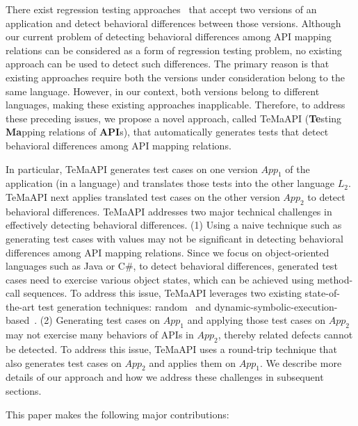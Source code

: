 There exist regression testing approaches~\cite{taneja08diffgen, robert07difference} that accept two versions of an application and detect behavioral differences between those versions. Although our current problem of detecting behavioral differences among API mapping relations can be considered as a form of regression testing problem, no existing approach can be used to detect such differences. The primary reason is that existing approaches require both the versions under consideration belong to the same language. However, in our context, both versions belong to different languages, making these existing approaches inapplicable. Therefore, to address these preceding issues, we propose a novel approach, called TeMaAPI (\textbf{Te}sting \textbf{Ma}pping relations of \textbf{API}s), that automatically generates tests that detect behavioral differences among API mapping relations.

In particular, TeMaAPI generates test cases on one version $App_1$ of the application (in a language) and translates those tests into the other language $L_2$. TeMaAPI next applies translated test cases on the other version $App_2$ to detect behavioral differences. TeMaAPI addresses two major technical challenges in effectively detecting behavioral differences. (1) Using a naive technique such as generating test cases with  values may not be significant in detecting behavioral differences among API mapping relations. Since we focus on object-oriented languages such as Java or C\#, to detect behavioral differences, generated test cases need to exercise various object states, which can be achieved using method-call sequences. To address this issue, TeMaAPI leverages two existing state-of-the-art test generation techniques: random~\cite{pacheco2007feedback} and dynamic-symbolic-execution-based~\cite{koushik:cute, godefroid:dart, tillmann2008pex}. (2) Generating test cases on $App_1$ and applying those test cases on $App_2$ may not exercise many behaviors of APIs in $App_2$, thereby related defects cannot be detected. To address this issue, TeMaAPI uses a round-trip technique that also generates test cases on $App_2$ and applies them on $App_1$. We describe more details of our approach and how we address these challenges in subsequent sections.

This paper makes the following major contributions:

